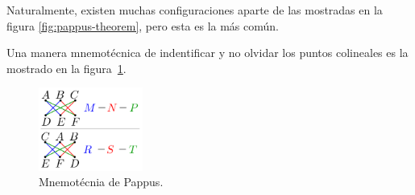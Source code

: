 \begin{multicols}{2}
    Naturalmente, existen muchas configuraciones aparte de las mostradas en la figura \ref{fig:pappus-theorem}, pero esta es la más común.

    Una manera mnemotécnica de indentificar y no olvidar los puntos colineales es la mostrado en la figura~\ref{fig:pappus-mnemonic}.
    \begin{figure}[H]
        \centering
        \includegraphics[width=3.4cm]{images/pappus-points}
        \caption{Mnemotécnia de Pappus.}
        \label{fig:pappus-mnemonic}
    \end{figure}
\end{multicols}

